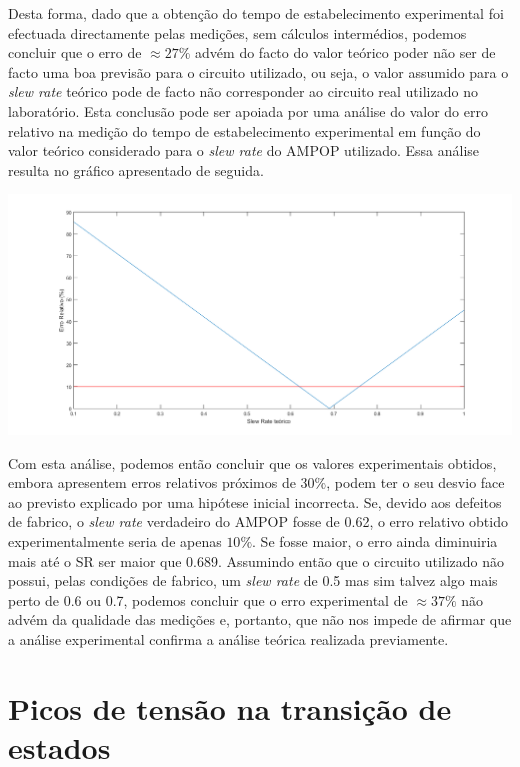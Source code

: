 \documentclass[a4paper,11pt]{report}
\begin{document}
Desta forma, dado que a obtenção do tempo de estabelecimento experimental foi efectuada directamente pelas medições, sem cálculos intermédios, podemos concluir que o erro de $\approx 27\%$ advém do facto do valor teórico poder não ser de facto uma boa previsão para o circuito utilizado, ou seja, o valor assumido para o \emph{slew rate} teórico pode de facto não corresponder ao circuito real utilizado no laboratório. Esta conclusão pode ser apoiada por uma análise do valor do erro relativo na medição do tempo de estabelecimento experimental em função do valor teórico considerado para o \emph{slew rate} do AMPOP utilizado. Essa análise resulta no gráfico apresentado de seguida.

\begin{center}
     \includegraphics[angle=0,width=1\textwidth]{ErroRelativo6.png}
     \label{fig:ErroRelativo6}
     \end{center}
Com esta análise, podemos então concluir que os valores experimentais obtidos, embora apresentem erros relativos próximos de $30\%$, podem ter o seu desvio face ao previsto explicado por uma hipótese inicial incorrecta. Se, devido aos defeitos de fabrico, o \emph{slew rate} verdadeiro do AMPOP fosse de 0.62, o erro relativo obtido experimentalmente seria de apenas $10\%$. Se fosse maior, o erro ainda diminuiria mais até o SR ser maior que 0.689. Assumindo então que o circuito utilizado não possui, pelas condições de fabrico, um \emph{slew rate} de 0.5 mas sim talvez algo mais perto de 0.6 ou 0.7, podemos concluir que o erro experimental de $\approx 37\%$ não advém da qualidade das medições e, portanto, que não nos impede de afirmar que a análise experimental confirma a análise teórica realizada previamente.


\chapter{Picos de tensão na transição de estados}
\end{document}
